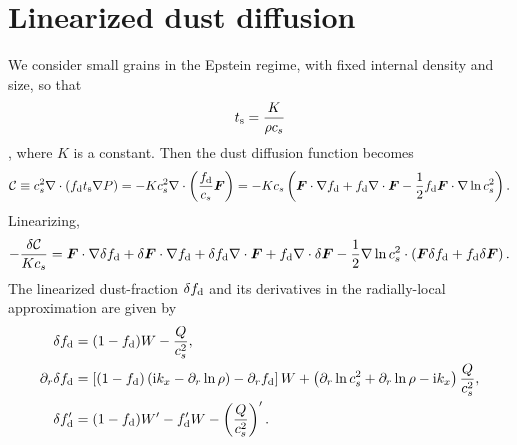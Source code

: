 \section{Linearized dust diffusion}\label{lin_dust}
We consider small grains in the Epstein regime, with fixed internal
density and size, so that
\begin{align}
  t_\mathrm{s}  =  \frac{K}{\rho c_s}\label{epstein}
\end{align}
\citep{price15}, where $K$ is a constant. Then the dust diffusion
function becomes
\begin{align}
  \mathcal{C} \equiv c_s^2\nabla\cdot\left(f_\mathrm{d}t_\mathrm{s}\nabla
  P\right) = - K c_s^2 \nabla\cdot
  \left(\frac{f_\mathrm{d}}{c_s}\bm{F}\right) =
  -Kc_s \left(\bm{F}\cdot\nabla f_\mathrm{d} + f_\mathrm{d} \nabla\cdot\bm{F}
  - \frac{1}{2}f_\mathrm{d}\bm{F}\cdot\nabla\ln{c_s^2}\right).  
\end{align}
Linearizing,
\begin{align}
  - \frac{\delta\mathcal{C}}{Kc_s} = \bm{F}\cdot\nabla\delta f_\mathrm{d} +
  \delta\bm{F}\cdot\nabla f_\mathrm{d} + \delta f_\mathrm{d}\nabla\cdot\bm{F} +
  f_\mathrm{d}\nabla\cdot\delta\bm{F} -
  \frac{1}{2}\nabla\ln{c_s^2}\cdot\left(\bm{F}\delta f_\mathrm{d} + f_\mathrm{d}
  \delta\bm{F}\right). 
\end{align}
The linearized dust-fraction $\delta f_\mathrm{d}$ and its derivatives in the
radially-local approximation are given by
\begin{align}
  \delta f_\mathrm{d}      &= (1-f_\mathrm{d})W - \frac{Q}{c_s^2}, \\
  \partial_r\delta f_\mathrm{d} &= \left[(1-f_\mathrm{d})\left(\mathrm{i} k_x -
    \partial_r\ln{\rho}\right) - \partial_rf_\mathrm{d}\right]W + \left(\partial_r\ln{c_s^2}
  + \partial_r\ln{\rho} - \mathrm{i} k_x \right)\frac{Q}{c_s^2},\\
  \delta f_\mathrm{d}^\prime &= (1-f_\mathrm{d})W^\prime - f_\mathrm{d}^\prime W -
  \left(\frac{Q}{c_s^2}\right)^\prime. 
\end{align}


